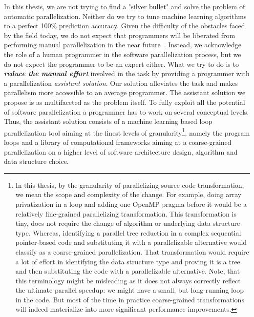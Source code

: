 \quad In this thesis, we are not trying to find a "silver bullet" and solve the problem of automatic parallelization. Neither do we try to tune machine learning algorithms to a perfect 100\% prediction accuracy. Given the difficulty of the obstacles faced by the field today, we do not expect that programmers will be liberated from performing manual parallelization in the near future~\cite{Larsen:2012:PML:2410141.2410600}. Instead, we acknowledge the role of a human programmer in the software parallelization process, but we do not expect the programmer to be an expert either. What we try to do is to \textit{\textbf{reduce the manual effort}} involved in the task by providing a programmer with a parallelization \textit{assistant solution}. Our solution alleviates the task and makes parallelism more accessible to an average programmer. The assistant solution we propose is as multifaceted as the problem itself. To fully exploit all the potential of software parallelization a programmer has to work on several conceptual levels. Thus, the assistant solution consists of a machine learning based loop parallelization tool \cite{assistant-aiseps} aiming at the finest levels of granularity\footnote{In this thesis, by the granularity of parallelizing source code transformation, we mean the scope and complexity of the change. For example, doing array privatization in a loop and adding one OpenMP pragma before it would be a relatively fine-grained parallelizing transformation. This transformation is tiny, does not require the change of algorithm or underlying data structure type. Whereas, identifying a parallel tree reduction in a complex sequential pointer-based code and substituting it with a parallelizable alternative would classify as a coarse-grained parallelization. That transformation would require a lot of effort in identifying the data structure type and proving it is a tree and then substituting the code with a parallelizable alternative. Note, that this terminology might be misleading as it does not always correctly reflect the ultimate parallel speedup: we might have a small, but long-running loop in the code. But most of the time in practice coarse-grained transformations will indeed materialize into more significant performance improvements.}, namely the program loops and a library of computational frameworks \cite{frameworks-repo} aiming at a coarse-grained parallelization on a higher level of software architecture design, algorithm and data structure choice.
